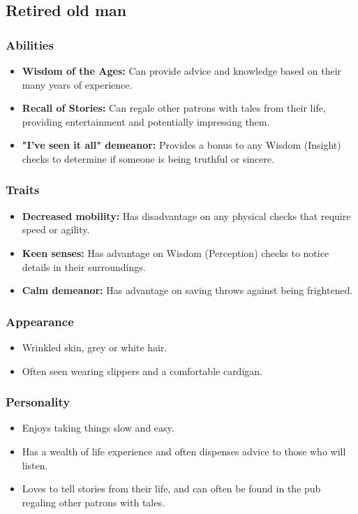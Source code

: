\documentclass{book}
\begin{document}
\subsection{Retired old man}
\subsubsection{Abilities}
\begin{itemize}
    \item \textbf{Wisdom of the Ages:} Can provide advice and knowledge based on their many years of experience.
    \item \textbf{Recall of Stories:} Can regale other patrons with tales from their life, providing entertainment and potentially impressing them. 
    \item \textbf{"I've seen it all" demeanor:} Provides a bonus to any Wisdom (Insight) checks to determine if someone is being truthful or sincere.
\end{itemize}
\subsubsection{Traits}
\begin{itemize}
    \item \textbf{Decreased mobility:} Has disadvantage on any physical checks that require speed or agility.
    \item \textbf{Keen senses:} Has advantage on Wisdom (Perception) checks to notice details in their surroundings.
    \item \textbf{Calm demeanor:} Has advantage on saving throws against being frightened.
\end{itemize}
\subsubsection{Appearance}
\begin{itemize}
    \item Wrinkled skin, grey or white hair.
    \item Often seen wearing slippers and a comfortable cardigan.
\end{itemize}
\subsubsection{Personality}
\begin{itemize}
    \item Enjoys taking things slow and easy.
    \item Has a wealth of life experience and often dispenses advice to those who will listen.
    \item Loves to tell stories from their life, and can often be found in the pub regaling other patrons with tales.
\end{itemize}
\end{document}

